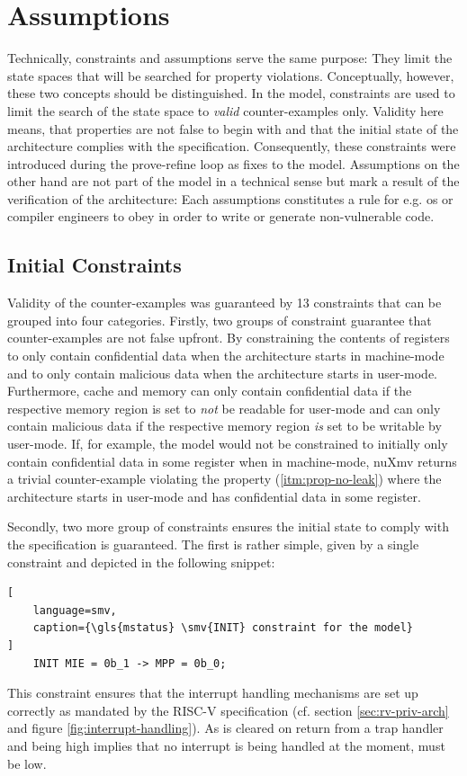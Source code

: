 \section{Assumptions}

Technically,  constraints and assumptions serve the same purpose: They limit the state spaces that will be searched for property violations.
Conceptually, however, these two concepts should be distinguished.
In the model,  constraints are used to limit the search of the state space to \textit{valid} counter-examples only.
Validity here means, that properties are not false to begin with and that the initial state of the architecture complies with the specification.
Consequently, these constraints were introduced during the prove-refine loop as fixes to the model.
Assumptions on the other hand are not part of the model in a technical sense but mark a result of the verification of the architecture: Each assumptions constitutes a rule for e.g. \gls{os} or compiler engineers to obey in order to write or generate non-vulnerable code.

\subsection{Initial Constraints}

Validity of the counter-examples was guaranteed by 13  constraints that can be grouped into four categories.
Firstly, two groups of constraint guarantee that counter-examples are not false upfront.
By constraining the contents of registers to only contain confidential data when the architecture starts in machine-mode and to only contain malicious data when the architecture starts in user-mode.
Furthermore, cache and memory can only contain confidential data if the respective memory region is set to \textit{not} be readable for user-mode and can only contain malicious data if the respective memory region \textit{is} set to be writable by user-mode.
If, for example, the model would not be constrained to initially only contain confidential data in some register when in machine-mode, nuXmv returns a trivial counter-example violating the  property (\ref{itm:prop-no-leak}) where the architecture starts in user-mode and has confidential data in some register.

Secondly, two more group of constraints ensures the initial state to comply with the specification is guaranteed.
The first is rather simple, given by a single constraint and depicted in the following snippet:
\begin{lstlisting}[
    language=smv,
    caption={\gls{mstatus} \smv{INIT} constraint for the model}
]
    INIT MIE = 0b_1 -> MPP = 0b_0;
\end{lstlisting}
This constraint ensures that the interrupt handling mechanisms are set up correctly as mandated by the RISC-V specification (cf. section \ref{sec:rv-priv-arch} and figure \ref{fig:interrupt-handling}).
As  is cleared on return from a trap handler and  being high implies that no interrupt is being handled at the moment,  must be low.


